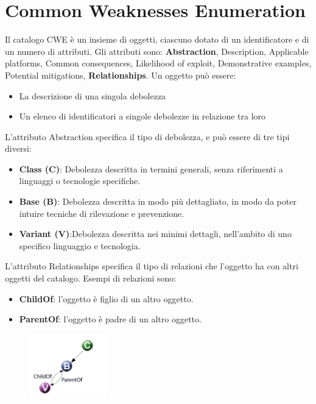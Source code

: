 \section{Common Weaknesses Enumeration}
Il catalogo CWE è un insieme di oggetti, ciascuno
dotato di un identificatore e di un numero di attributi. Gli attributi sono: \textbf{Abstraction}, Description, Applicable platforms, Common
consequences, Likelihood of exploit, Demonstrative
examples, Potential mitigations, \textbf{Relationships}. Un oggetto può essere:
\begin{itemize}
    \item La descrizione di una singola debolezza
    \item Un elenco di identificatori a singole debolezze in
relazione tra loro
\end{itemize}
L’attributo Abstraction specifica il tipo di debolezza, e può essere di tre tipi diversi:
\begin{itemize}
    \item \textbf{Class (C)}: Debolezza descritta in termini generali, senza riferimenti
a linguaggi o tecnologie specifiche.
    \item \textbf{Base (B)}: Debolezza descritta in modo più dettagliato, in modo da
poter intuire tecniche di rilevazione e prevenzione.
    \item \textbf{Variant (V)}:Debolezza descritta nei minimi dettagli, nell’ambito di uno
specifico linguaggio e tecnologia.
\end{itemize}
L’attributo Relationships specifica il tipo di relazioni
che l’oggetto ha con altri oggetti del catalogo. Esempi di relazioni sono:
\begin{itemize}
    \item \textbf{ChildOf}: l'oggetto è figlio di un altro oggetto.
    \item \textbf{ParentOf}: l'oggetto è padre di un altro oggetto.
\end{itemize}

\begin{figure}[hbpt!]
    \centering
    \includegraphics[width=0.3\textwidth]{./Images/cap3/3.1.png}
\end{figure}
\FloatBarrier

